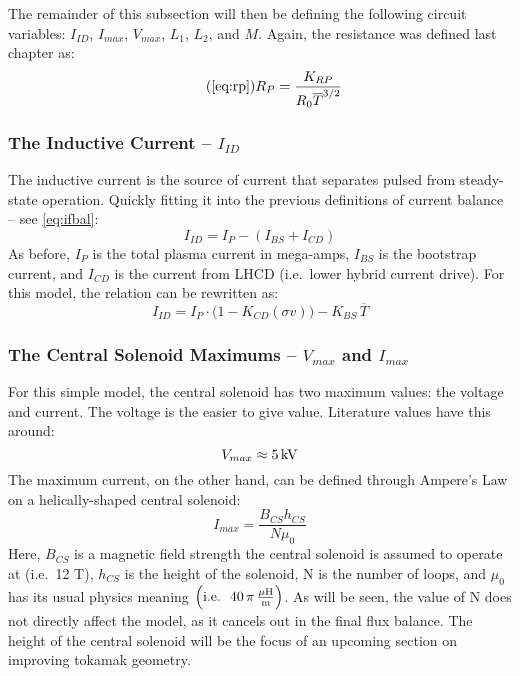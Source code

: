 The remainder of this subsection will then be defining the following circuit variables: $I_{ID}$, $I_{max}$, $V_{max}$, $L_1$, $L_2$, and $M$. Again, the resistance was defined last chapter as:
\begin{equation}
	\tag{\ref{eq:rp}}
	R_P = \frac{K_{RP}}{R_0 \overline T ^ {3/2}}
\end{equation}

\subsubsection{The Inductive Current -- $I_{ID}$}

The inductive current is the source of current that separates pulsed from steady-state operation. Quickly fitting it into the previous definitions of current balance -- see \cref{eq:ifbal}:
\begin{equation}
	I_{ID} = I_P - ( I_{BS} + I_{CD} )
\end{equation}
As before, $I_P$ is the total plasma current in mega-amps, $I_{BS}$ is the bootstrap current, and $I_{CD}$ is the current from LHCD (i.e.\ lower hybrid current drive). For this model, the relation can be rewritten as:
\begin{equation}
	I_{ID} = I_P \cdot \Big( 1 - K_{CD} ( \sigma v ) \Big) - K_{BS} \, \overline T
\end{equation}

\subsubsection{The Central Solenoid Maximums -- $V_{max}$ and $I_{max}$}

For this simple model, the central solenoid has two maximum values: the voltage and current. The voltage is the easier to give value. Literature values have this around: \cite{arc}
\begin{equation}
	V_{max} \approx 5 \, \textnormal{kV}
\end{equation}
The maximum current, on the other hand, can be defined through Ampere's Law on a helically-shaped central solenoid: \cite{griffiths}
\begin{equation}
	I_{max} = \frac{B_{CS} h_{CS}}{N \mu_0}
\end{equation}
Here, $B_{CS}$ is a magnetic field strength the central solenoid is assumed to operate at (i.e.\ 12 T), $h_{CS}$ is the height of the solenoid, N is the number of loops, and $\mu_0$ has its usual physics meaning $\left( \textnormal{i.e.\ } \ 40 \, \pi \, \frac{ \mu \textnormal{H}}{\textnormal{m}} \right)$. As will be seen, the value of N does not directly affect the model, as it cancels out in the final flux balance. The height of the central solenoid will be the focus of an upcoming section on improving tokamak geometry.


